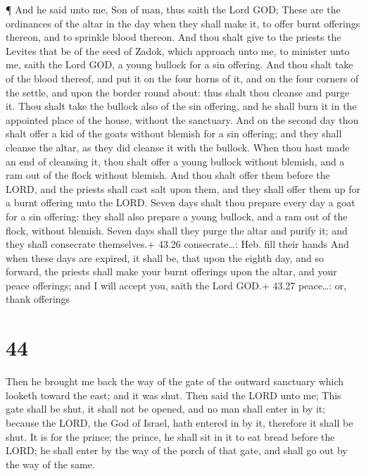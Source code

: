  ¶ And he said unto me, Son of man, thus saith the Lord
GOD; These are the ordinances of the altar in the day when they shall
make it, to offer burnt offerings thereon, and to sprinkle blood
thereon.  And thou shalt give to the priests the Levites
that be of the seed of Zadok, which approach unto me, to minister unto
me, saith the Lord GOD, a young bullock for a sin offering.
 And thou shalt take of the blood thereof, and put it on
the four horns of it, and on the four corners of the settle, and upon
the border round about: thus shalt thou cleanse and purge it.
 Thou shalt take the bullock also of the sin offering, and
he shall burn it in the appointed place of the house, without the
sanctuary.  And on the second day thou shalt offer a kid of
the goats without blemish for a sin offering; and they shall cleanse the
altar, as they did cleanse it with the bullock.  When thou
hast made an end of cleansing it, thou shalt offer a young bullock
without blemish, and a ram out of the flock without blemish.
 And thou shalt offer them before the LORD, and the priests
shall cast salt upon them, and they shall offer them up for a burnt
offering unto the LORD.  Seven days shalt thou prepare
every day a goat for a sin offering: they shall also prepare a young
bullock, and a ram out of the flock, without blemish. 
Seven days shall they purge the altar and purify it; and they shall
consecrate themselves.+ 43.26 consecrate\ldots: Heb. fill their hands
 And when these days are expired, it shall be, that upon
the eighth day, and so forward, the priests shall make your burnt
offerings upon the altar, and your peace offerings; and I will accept
you, saith the Lord GOD.+ 43.27 peace\ldots: or, thank offerings

\hypertarget{section-43}{%
\section{44}\label{section-43}}

 Then he brought me back the way of the gate of the outward
sanctuary which looketh toward the east; and it was shut. 
Then said the LORD unto me; This gate shall be shut, it shall not be
opened, and no man shall enter in by it; because the LORD, the God of
Israel, hath entered in by it, therefore it shall be shut. 
It is for the prince; the prince, he shall sit in it to eat bread before
the LORD; he shall enter by the way of the porch of that gate, and shall
go out by the way of the same.

